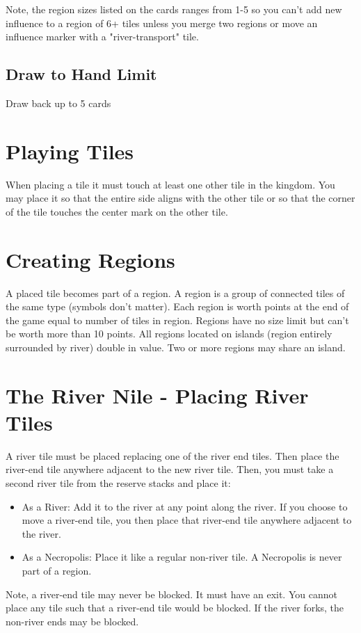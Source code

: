 \documentclass[12pt]{article}
\newenvironment{itemizeCustom}
{\begin{itemize}
  \setlength{\itemsep}{1pt}
  \setlength{\parskip}{0pt}
  \setlength{\parsep}{0pt}}
{\end{itemize}}
\begin{document}
\begin{multicols*}{2}
Note, the region sizes listed on the cards ranges from 1-5 so you can't add new influence to a region of 6+ tiles unless you merge two regions or move an influence marker with a "river-transport" tile.

\subsection*{Draw to Hand Limit}
Draw back up to 5 cards

\section*{Playing Tiles}
When placing a tile it must touch at least one other tile in the kingdom. You may place it so that the entire side aligns with the other tile or so that the corner of the tile touches the center mark on the other tile.

\section*{Creating Regions}
A placed tile becomes part of a region. A region is a group of connected tiles of the same type (symbols don't matter). Each region is worth points at the end of the game equal to number of tiles in region. Regions have no size limit but can't be worth more than 10 points. All regions located on islands (region entirely surrounded by river) double in value. Two or more regions may share an island.

\section*{The River Nile - Placing River Tiles}
A river tile must be placed replacing one of the river end tiles. Then place the river-end tile anywhere adjacent to the new river tile. Then, you must take a second river tile from the reserve stacks and place it:
\begin{itemizeCustom}
    \item As a River: Add it to the river at any point along the river. If you choose to move a river-end tile, you then place that river-end tile anywhere adjacent to the river.
    \item As a Necropolis: Place it like a regular non-river tile. A Necropolis is never part of a region.
\end{itemizeCustom}
Note, a river-end tile may never be blocked. It must have an exit. You cannot place any tile such that a river-end tile would be blocked. If the river forks, the non-river ends may be blocked.


\end{multicols*}
\end{document}
